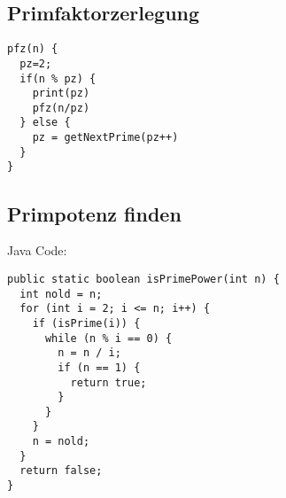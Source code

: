 \subsection{Primfaktorzerlegung} %
\begin{lstlisting}
pfz(n) {
  pz=2;
  if(n % pz) {
    print(pz)
    pfz(n/pz)
  } else {
    pz = getNextPrime(pz++)
  }
}
\end{lstlisting}

\subsection{Primpotenz finden} %
\label{sub:primpotenz_finden}
Java Code:
\begin{lstlisting}
public static boolean isPrimePower(int n) {
  int nold = n;
  for (int i = 2; i <= n; i++) {
    if (isPrime(i)) {
      while (n % i == 0) {
        n = n / i;
        if (n == 1) {
          return true;
        }
      }
    }
    n = nold;
  }
  return false;
}
\end{lstlisting}
